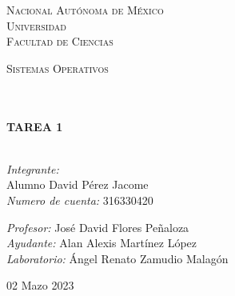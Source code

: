 \documentclass[14pt]{book}
\begin{document}
\begin{center}
\begin{minipage}{0.48\textwidth}
\begin{flushright}
    \end{flushright}
  \end{minipage}
  \vspace*{-1.5cm}
  \textsc{\huge Nacional Autónoma de México \\ \vspace{-4px} Universidad }\\[2cm]
  \textsc{\LARGE Facultad de Ciencias}\\[1.5cm]
  \begin{minipage}{0.9\textwidth}
    \begin{center}
      \textsc{\LARGE Sistemas Operativos}
    \end{center}
  \end{minipage}\\[0.5cm]
  \vspace*{1cm}
  \HRule \\[0.4cm]
  { \huge \bfseries TAREA 1}\\[0.4cm]
  \HRule \\[1.5cm]
  \begin{minipage}{0.52\textwidth}
    \begin{flushleft} \large \small \vspace{-0.6cm} \vspace{-0.6cm}
      \emph{Integrante:}\\
      Alumno David Pérez Jacome \\
      \emph{Numero de cuenta:} 316330420 \vspace*{2cm}
    \end{flushleft}
  \end{minipage}
  \begin{minipage}{0.46\textwidth}
    \vspace{-0.6cm}
    \begin{flushright} \large \small \emph{Profesor:}
      José David Flores Peñaloza \\
      \emph{Ayudante:}
      Alan Alexis Martínez López \\

      \emph{Laboratorio:}
      Ángel Renato Zamudio Malagón \\
    \end{flushright}
  \end{minipage}
  \vspace*{1cm}
  \vspace{2cm}
  \begin{center}
    {\large 02 Mazo 2023}
  \end{center}
\end{center}
\end{document}

